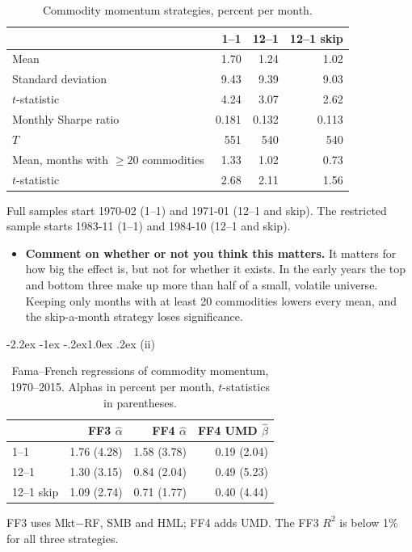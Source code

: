 \documentclass[11pt]{article}
\makeatletter
\renewcommand\subsection{\@startsection{subsection}{2}{0pt}%
  {-2.2ex \@plus -1ex \@minus -.2ex}{1.0ex \@plus .2ex}%
  {\normalfont\bfseries\normalsize\color{psink}}}
\makeatother
\begin{document}
\begin{table}[H]
\centering
\caption{Commodity momentum strategies, percent per month.}
\small
\begin{tabular}{lrrr}
\toprule
& 1--1 & 12--1 & 12--1 skip \\
\midrule
Mean & 1.70 & 1.24 & 1.02 \\
Standard deviation & 9.43 & 9.39 & 9.03 \\
$t$-statistic & 4.24 & 3.07 & 2.62 \\
Monthly Sharpe ratio & 0.181 & 0.132 & 0.113 \\
$T$ & 551 & 540 & 540 \\
\midrule
Mean, months with $\geq 20$ commodities & 1.33 & 1.02 & 0.73 \\
\quad $t$-statistic & 2.68 & 2.11 & 1.56 \\
\bottomrule
\end{tabular}
\vspace{2pt}\begin{minipage}{0.75\textwidth}\footnotesize
Full samples start 1970-02 (1--1) and 1971-01 (12--1 and skip). The restricted sample starts 1983-11 (1--1) and 1984-10 (12--1 and skip).
\end{minipage}
\end{table}

\begin{itemize}
\setlength{\itemsep}{4pt}\setlength{\parskip}{0pt}

\item \textbf{Comment on whether or not you think this matters.} It matters for how big the effect is, but not for whether it exists. In the early years the top and bottom three make up more than half of a small, volatile universe. Keeping only months with at least 20 commodities lowers every mean, and the skip-a-month strategy loses significance.

\end{itemize}

\subsection{(ii)}

\begin{table}[H]
\centering
\caption{Fama--French regressions of commodity momentum, 1970--2015. Alphas in percent per month, $t$-statistics in parentheses.}
\small
\begin{tabular}{lrrr}
\toprule
& FF3 $\hat\alpha$ & FF4 $\hat\alpha$ & FF4 UMD $\hat\beta$ \\
\midrule
1--1 & 1.76 (4.28) & 1.58 (3.78) & 0.19 (2.04) \\
12--1 & 1.30 (3.15) & 0.84 (2.04) & 0.49 (5.23) \\
12--1 skip & 1.09 (2.74) & 0.71 (1.77) & 0.40 (4.44) \\
\bottomrule
\end{tabular}
\vspace{2pt}\begin{minipage}{0.75\textwidth}\footnotesize
FF3 uses Mkt$-$RF, SMB and HML; FF4 adds UMD. The FF3 $R^2$ is below 1\% for all three strategies.
\end{minipage}
\end{table}
\end{document}
